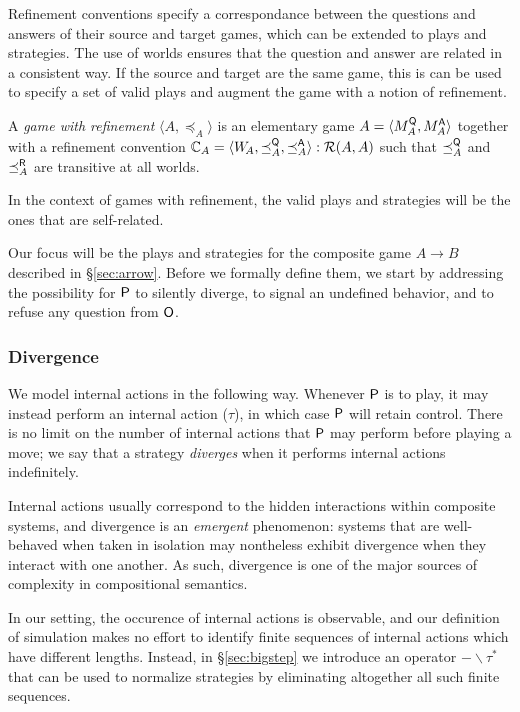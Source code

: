 Refinement conventions specify a correspondance
between the questions and answers of their source and target games,
which can be extended to plays and strategies.
The use of worlds ensures that the question and answer
are related in a consistent way.
If the source and target are the same game,
this is can be used to specify a set of valid plays
and augment the game with a notion of refinement.

\begin{definition} %
A \emph{game with refinement} $\langle A, \preceq_A \rangle$
is an elementary game
$A = \langle M_A^{ \mathsf{Q} }, M_A^{ \mathsf{A} } \rangle$
together with a refinement convention
$\mathbb{C}_A = \langle W_{\!A}, {\preceq}_A^{ \mathsf{Q} }, {\preceq}_A^{ \mathsf{A} } \rangle
  : \mathcal{R}(A, A)$
such that $\preceq_A^{ \mathsf{Q} }$ and $\preceq_A^{ \mathsf{R} }$
are transitive at all worlds.
\end{definition}

In the context of games with refinement,
the valid plays and strategies will be the ones
that are self-related.

Our focus will be the plays and strategies
for the composite game $A \rightarrow B$
described in \S\ref{sec:arrow}.
Before we formally define them,
we start by addressing
the possibility for $ \mathsf{P} $ to silently diverge,
to signal an undefined behavior,
and to refuse any question from $ \mathsf{O} $.


\subsubsection{Divergence} %

We model internal actions in the following way.
Whenever $ \mathsf{P} $ is to play,
it may instead perform an internal action ($\tau$),
in which case $ \mathsf{P} $ will retain control.
There is no limit on the number of internal actions that
$ \mathsf{P} $ may perform before playing a move;
we say that a strategy \emph{diverges}
when it performs internal actions indefinitely.

Internal actions usually correspond to the hidden interactions
within composite systems, and
divergence is an \emph{emergent} phenomenon:
systems that are well-behaved when taken in isolation
may nontheless exhibit divergence when they interact with one another.
As such,
divergence is one of the major sources of complexity
in compositional semantics.

In our setting,
the occurence of internal actions
is observable,
and our definition of simulation
makes no effort
to identify finite sequences of internal actions
which have different lengths.
Instead,
in \S\ref{sec:bigstep}
we introduce an operator $- \backslash \tau^*$
that can be used to normalize strategies
by eliminating altogether all such finite sequences.

